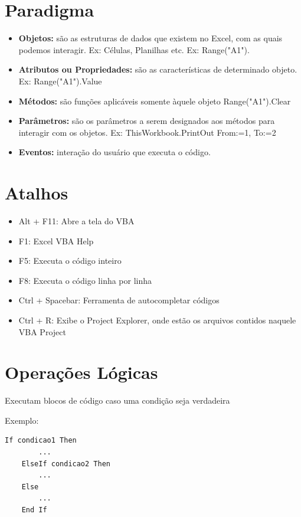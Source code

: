 \documentclass[12pt, a4paper]{article}
\begin{document}
\section{Paradigma}
    \begin{itemize}
        \item \textbf{Objetos:} são as estruturas de dados que existem no Excel, com as quais podemos interagir. Ex: Células, Planilhas etc. Ex: Range("A1").
        \item \textbf{Atributos ou Propriedades:} são as características de determinado objeto. Ex: Range("A1").Value 
        \item \textbf{Métodos:} são funções aplicáveis somente àquele objeto
        Range("A1").Clear
        \item \textbf{Parâmetros:} são os parâmetros a serem designados aos métodos para interagir com os objetos. Ex: 
        ThisWorkbook.PrintOut From:=1, To:=2
        \item \textbf{Eventos:} interação do usuário que executa o código.
    \end{itemize}
    
\section{Atalhos}
    \begin{itemize}
        \item Alt + F11: Abre a tela do VBA
        \item F1: Excel VBA Help
        \item F5: Executa o código inteiro
        \item F8: Executa o código linha por linha
        \item Ctrl + Spacebar: Ferramenta de autocompletar códigos
        \item Ctrl + R: Exibe o Project Explorer, onde estão os arquivos contidos naquele VBA Project
    \end{itemize}

\section{Operações Lógicas}

    Executam blocos de código caso uma condição seja verdadeira 

Exemplo:

\begin{lstlisting}[language = VBScript]
    If condicao1 Then
        ...
    ElseIf condicao2 Then
        ...
    Else
        ...
    End If
\end{lstlisting}
\end{document}
